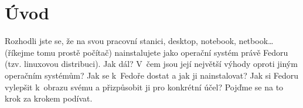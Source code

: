 \chapter*{Úvod}
Rozhodli jste se, že na svou pracovní stanici, desktop, notebook, netbook\dots (říkejme tomu prostě počítač) nainstalujete jako operační systém právě Fedoru (tzv. linuxovou distribuci). Jak dál? V~čem jsou její největší výhody oproti jiným operačním systémům? Jak se k~Fedoře dostat a jak ji nainstalovat? Jak si Fedoru vylepšit k~obrazu svému a přizpůsobit ji pro konkrétní účel? Pojďme se na to krok za krokem podívat.
